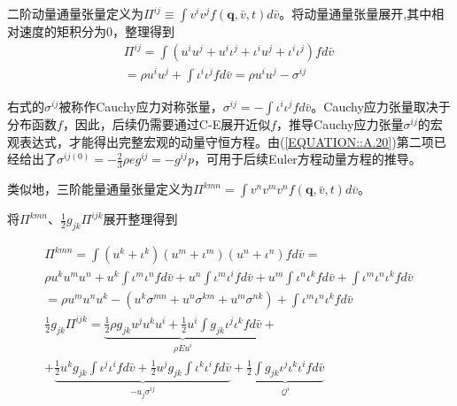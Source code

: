\documentclass[LBMDerivation.tex]{subfiles}
\begin{document}
二阶动量通量张量定义为$\Pi^{ij} \equiv \int  v^{i} v^{j} f(\boldsymbol{q}, \bar{v}, t)d \bar{v}$。将动量通量张量展开,其中相对速度的矩积分为0，整理得到
\begin{equation}
  \begin{aligned}
    \Pi^{i j}=\int   \left(u^{i} u^{j}+u^{i} \iota^{j}+\iota^{i} u^{j}+\iota^{i} \iota^{j}\right) f  d \bar{v} \\
    =\rho u^{i} u^{j}+\int \iota^{i} \iota^{j} f  d \bar{v} = \rho u^{i} u^{j} -\sigma^{i j}
  \end{aligned}
  \label{EQUATION::动量通量推导} ~
\end{equation}

右式的$\sigma^{i j}$被称作Cauchy应力对称张量，$\sigma^{i j}=-\int \iota^{i} \iota^{j} f  d \bar{v}$。Cauchy应力张量取决于分布函数$f$，因此，后续仍需要通过C-E展开近似$f$，推导Cauchy应力张量$\sigma^{i j}$的宏观表达式，才能得出完整宏观的动量守恒方程。由(\ref{EQUATION::A.20})第二项已经给出了$\sigma^{i j(0)}=-\frac{2}{3}\rho e g^{i j}=- g^{i j}p$，可用于后续Euler方程动量方程的推导。


类似地，三阶能量通量张量定义为$\Pi^{kmn}= \int  v^n v^{m} v^{n} f(\boldsymbol{q}, \bar{v}, t) d \bar{v}$。



将$\Pi^{kmn}$、$\frac{1}{2} g_{jk}\Pi^{i j k}$展开整理得到



\begin{equation}
  \begin{aligned}
    \Pi^{kmn}= \int  (u^k+\iota^k)( u^m + \iota^m )(u^n + \iota^n) f d \bar{v} =                                                       \\  \rho u^k u^m u^n   +  u^k\int \iota^m \iota^n f  d \bar{v} +   u^n \int  \iota^m \iota^{i} f d \bar{v}  +  u^m  \int   \iota^n \iota^{k} f d \bar{v} + \int \iota^m \iota^n  \iota^{k} f  d \bar{v} \\
    = \rho  u^m u^n u^k  - (u^k \sigma^{mn}+u^n \sigma^{km}+u^m \sigma^{nk}) + \int \iota^m \iota^n  \iota^{k} f  d \bar{v}
    \\
    \frac{1}{2} g_{jk}\Pi^{i j k}
    = \underbrace{\frac{1}{2} \rho g_{jk} u^j u^k u^i  + \frac{1}{2} u^i\int g_{jk} \iota^{j} \iota^{k} f  d \bar{v}}_{\rho  E u^i } + \\
    +  \underbrace{\frac{1}{2} u^k g_{jk}  \int   \iota^{j} \iota^{i} f d \bar{v}  + \frac{1}{2} u^j g_{jk}  \int   \iota^{k} \iota^{i} f d \bar{v} }_{ -u_j \sigma^{ij}} +  \underbrace{\frac{1}{2}\int g_{jk} \iota^{j} \iota^{k}  \iota^{i} f  d \bar{v}}_{\mathcal{Q}^i}
  \end{aligned}
  \label{中间过程} ~
\end{equation}
\end{document}
